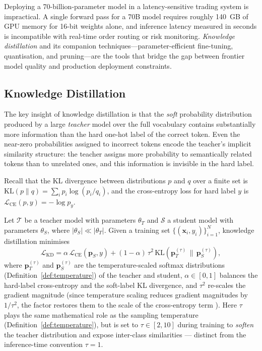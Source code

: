 \begin{deepdive}

Deploying a 70-billion-parameter model in a latency-sensitive trading system is
impractical.  A single forward pass for a 70B model requires roughly 140~GB of GPU
memory for 16-bit weights alone, and inference latency measured in seconds is
incompatible with real-time order routing or risk monitoring.  \emph{Knowledge
distillation} and its companion techniques---parameter-efficient fine-tuning,
quantisation, and pruning---are the tools that bridge the gap between frontier
model quality and production deployment constraints.

\subsection{Knowledge Distillation}
\label{sec:distillation-kd}

The key insight of knowledge distillation \citep{hinton2015distilling} is that the
\emph{soft} probability distribution produced by a large \emph{teacher} model over
the full vocabulary contains substantially more information than the hard one-hot
label of the correct token.  Even the near-zero probabilities assigned to incorrect
tokens encode the teacher's implicit similarity structure: the teacher assigns more
probability to semantically related tokens than to unrelated ones, and this
information is invisible in the hard label.

Recall that the KL divergence between distributions $p$ and $q$ over a finite set is $\mathrm{KL}(p\|q) = \sum_i p_i \log(p_i/q_i)$, and the cross-entropy loss for hard label $y$ is $\mathcal{L}_{\mathrm{CE}}(p, y) = -\log p_y$.

\begin{definition}
\label{def:kd}
Let $\mathcal{T}$ be a teacher model with parameters $\theta_T$ and
$\mathcal{S}$ a student model with parameters $\theta_S$, where
$|\theta_S| \ll |\theta_T|$.  Given a training set
$\{(\mathbf{x}_i, y_i)\}_{i=1}^N$, knowledge distillation minimises
\begin{equation}
  \mathcal{L}_{\mathrm{KD}} = \alpha \,\mathcal{L}_{\mathrm{CE}}(\mathbf{p}_S, y)
    + (1-\alpha)\, \tau^2 \,
      \mathrm{KL}\!\left(\mathbf{p}_T^{(\tau)} \,\big\|\, \mathbf{p}_S^{(\tau)}\right),
  \label{eq:kd-loss}
\end{equation}
where $\mathbf{p}_T^{(\tau)}$ and $\mathbf{p}_S^{(\tau)}$ are the temperature-scaled
softmax distributions (Definition~\ref{def:temperature}) of the teacher and student,
$\alpha \in [0,1]$ balances the hard-label cross-entropy and the soft-label KL
divergence, and $\tau^2$ re-scales the gradient magnitude (since temperature scaling
reduces gradient magnitudes by $1/\tau^2$, the factor restores them to the
scale of the cross-entropy term \citep{hinton2015distilling}).
Here $\tau$ plays the same mathematical role as the sampling temperature
(Definition~\ref{def:temperature}), but is set to $\tau \in [2, 10]$ during
training to \emph{soften} the teacher distribution and expose inter-class
similarities --- distinct from the inference-time convention $\tau = 1$.
\end{definition}


\end{deepdive}
